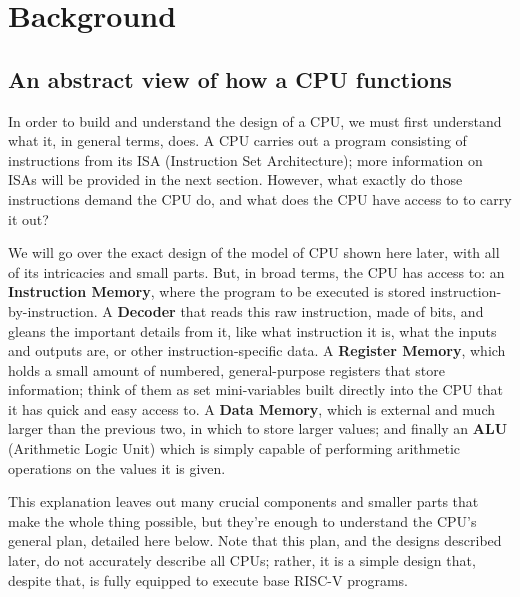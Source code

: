 \documentclass[12pt,twoside]{reedthesis}
\begin{document}
\chapter{Background}
\section{An abstract view of how a CPU functions}
In order to build and understand the design of a CPU, we must first understand what it, in general terms, does. A CPU carries out a program consisting of instructions from its ISA (Instruction Set Architecture); more information on ISAs will be provided in the next section. However, what exactly do those instructions demand the CPU do, and what does the CPU have access to to carry it out?

We will go over the exact design of the model of CPU shown here later, with all of its intricacies and small parts. But, in broad terms, the CPU has access to: an \textbf{Instruction Memory}, where the program to be executed is stored instruction-by-instruction. A \textbf{Decoder} that reads this raw instruction, made of bits, and gleans the important details from it, like what instruction it is, what the inputs and outputs are, or other instruction-specific data. A \textbf{Register Memory}, which holds a small amount of numbered, general-purpose registers that store information; think of them as set mini-variables built directly into the CPU that it has quick and easy access to. A \textbf{Data Memory}, which is external and much larger than the previous two, in which to store larger values; and finally an \textbf{ALU} (Arithmetic Logic Unit) which is simply capable of performing arithmetic operations on the values it is given.

This explanation leaves out many crucial components and smaller parts that make the whole thing possible, but they're enough to understand the CPU's general plan, detailed here below. Note that this plan, and the designs described later, do not accurately describe all CPUs; rather, it is a simple design that, despite that, is fully equipped to execute base RISC-V programs.
\end{document}
